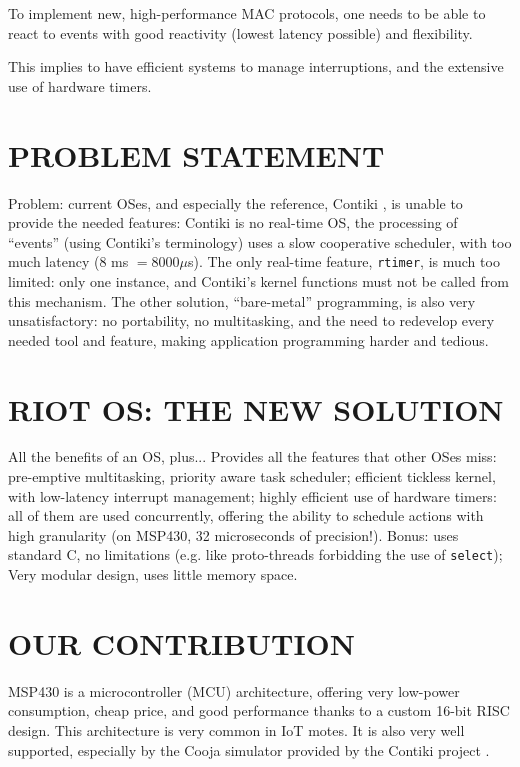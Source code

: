 \documentclass[a4paper,twoside]{article}
\begin{document}
To implement new, high-performance MAC protocols, one needs to be able to react
to events with good reactivity (lowest latency possible) and flexibility.

This implies to have efficient systems to manage interruptions, and the extensive
use of hardware timers.

\section{\uppercase{Problem statement}}

Problem: current OSes, and especially the reference, Contiki \cite{Contiki},
is unable to provide the needed features: Contiki is no real-time OS,
the processing of ``events'' (using Contiki's terminology) uses a slow
cooperative scheduler, with too much latency (8 ms $= 8000 \mu$s).
The only real-time feature, \texttt{rtimer}, is much too limited: only one
instance, and Contiki's kernel functions must not be called from this
mechanism.
The other solution, ``bare-metal'' programming, is also very unsatisfactory:
no portability, no multitasking, and the need to redevelop every needed tool
and feature,  making application programming harder and tedious.

\section{\uppercase{RIOT OS: the new solution}}

\cite{RIOT}
All the benefits of an OS, plus...
Provides all the features that other OSes miss:
pre-emptive multitasking, priority aware task scheduler;
efficient tickless kernel, with low-latency interrupt management;
highly efficient use of hardware timers: all of them are used concurrently,
offering the ability to schedule actions with high granularity (on MSP430,
32 microseconds of precision!).
Bonus: uses standard C, no limitations (e.g. like proto-threads forbidding
the use of \texttt{select});
Very modular design, uses little memory space.

\section{\uppercase{Our contribution}}

MSP430 is a microcontroller (MCU) architecture, offering very low-power
consumption, cheap price, and good performance thanks to a custom 16-bit
RISC design. This architecture is very common in IoT motes.
It is also very well supported, especially by the Cooja simulator
provided by the Contiki project \cite{Contiki}.
\end{document}
